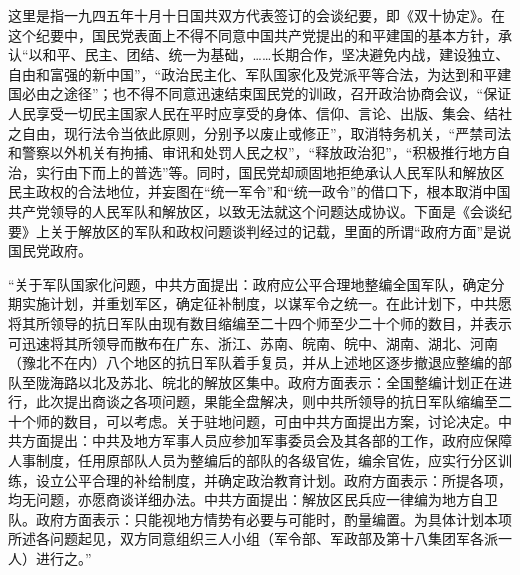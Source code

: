 \begin{maonote}
这里是指一九四五年十月十日国共双方代表签订的会谈纪要，即《双十协定》。在这个纪要中，国民党表面上不得不同意中国共产党提出的和平建国的基本方针，承认“以和平、民主、团结、统一为基础，……长期合作，坚决避免内战，建设独立、自由和富强的新中国”，“政治民主化、军队国家化及党派平等合法，为达到和平建国必由之途径”；也不得不同意迅速结束国民党的训政，召开政治协商会议，“保证人民享受一切民主国家人民在平时应享受的身体、信仰、言论、出版、集会、结社之自由，现行法令当依此原则，分别予以废止或修正”，取消特务机关，“严禁司法和警察以外机关有拘捕、审讯和处罚人民之权”，“释放政治犯”，“积极推行地方自治，实行由下而上的普选”等。同时，国民党却顽固地拒绝承认人民军队和解放区民主政权的合法地位，并妄图在“统一军令”和“统一政令”的借口下，根本取消中国共产党领导的人民军队和解放区，以致无法就这个问题达成协议。下面是《会谈纪要》上关于解放区的军队和政权问题谈判经过的记载，里面的所谓“政府方面”是说国民党政府。

“关于军队国家化问题，中共方面提出：政府应公平合理地整编全国军队，确定分期实施计划，并重划军区，确定征补制度，以谋军令之统一。在此计划下，中共愿将其所领导的抗日军队由现有数目缩编至二十四个师至少二十个师的数目，并表示可迅速将其所领导而散布在广东、浙江、苏南、皖南、皖中、湖南、湖北、河南（豫北不在内）八个地区的抗日军队着手复员，并从上述地区逐步撤退应整编的部队至陇海路以北及苏北、皖北的解放区集中。政府方面表示：全国整编计划正在进行，此次提出商谈之各项问题，果能全盘解决，则中共所领导的抗日军队缩编至二十个师的数目，可以考虑。关于驻地问题，可由中共方面提出方案，讨论决定。中共方面提出：中共及地方军事人员应参加军事委员会及其各部的工作，政府应保障人事制度，任用原部队人员为整编后的部队的各级官佐，编余官佐，应实行分区训练，设立公平合理的补给制度，并确定政治教育计划。政府方面表示：所提各项，均无问题，亦愿商谈详细办法。中共方面提出：解放区民兵应一律编为地方自卫队。政府方面表示：只能视地方情势有必要与可能时，酌量编置。为具体计划本项所述各问题起见，双方同意组织三人小组（军令部、军政部及第十八集团军各派一人）进行之。”


\end{maonote}
